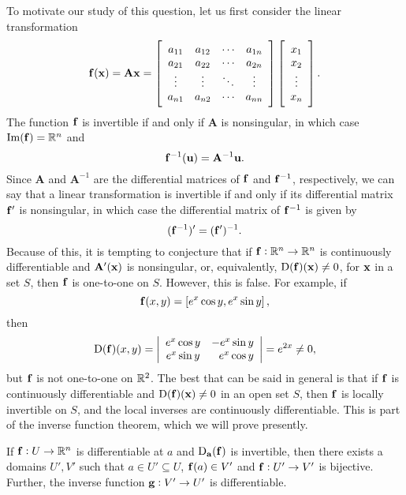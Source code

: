 To motivate our study of this question, let us first consider
 the linear transformation
$$
\mathbf{ f}(\mathbf{ x})=\mathbf{A}\mathbf{ x}=\left[\begin{array}{cccc}
a_{11}&a_{12}&\cdots&a_{1n}\\
a_{21}&a_{22}&\cdots&a_{2n}\\\vdots&\vdots&\ddots&\vdots\\
a_{n1}&a_{n2}&\cdots&a_{nn}\end{array}\right]
\left[\begin{array}{c} x_1\\ x_2\\\vdots\\ x_n\end{array}\right].
$$
The function $\mathbf{ f}$ is invertible if and only if
$\mathbf{A}$ is nonsingular, in which case $\operatorname{Im}(\mathbf{ f})=\mathbb{R}^n$ and
$$
\mathbf{ f}^{-1}(\mathbf{ u})=\mathbf{A}^{-1}\mathbf{ u}.
$$
Since $\mathbf{A}$ and $\mathbf{A}^{-1}$ are the differential matrices of
$\mathbf{ f}$ and $\mathbf{ f}^{-1}$, respectively, we can say that a linear
transformation is invertible if and only if its differential matrix
$\mathbf{ f}'$ is nonsingular, in which case the differential matrix of
$\mathbf{ f}^{-1}$ is given by
$$
(\mathbf{ f}^{-1})'=(\mathbf{ f}')^{-1}.
$$
Because of this, it is tempting to conjecture that if $\mathbf{ f}:
\mathbb{R}^n\to \mathbb{R}^n$ is continuously differentiable
 and $\mathbf{A}'(\mathbf{ x})$
 is nonsingular, or, equivalently, ${\mathrm{D}}(\mathbf{ f})(\mathbf{ x})\ne0$, for
$\mathbf{ x}$ in a set $S$, then $\mathbf{ f}$ is one-to-one on $S$. However,
this is false. For example, if
$$
\mathbf{ f}(x,y)=\left[ e^x\cos y, e^x\sin
y\right],
$$
then
\begin{equation} \label{eq:6.3.19}
{\mathrm{D}}(\mathbf{ f})(x,y)=\left|\begin{array}{cr} e^x\cos y&-e^x\sin y\\
e^x\sin y&e^x\cos y\end{array}\right|=e^{2x}\ne0,
\end{equation}
but $\mathbf{ f}$ is not one-to-one on $\mathbb{R}^2$. The best that can be said in general is
that if $\mathbf{ f}$ is continuously differentiable and
 ${\mathrm{D}}(\mathbf{ f})(\mathbf{ x})
\ne0$ in an open set $S$, then $\mathbf{ f}$ is locally invertible on
$S$, and the local inverses are continuously differentiable. This is
part of the inverse function theorem, which we will prove presently.
 
  \begin{theorem}
    If $\mathbf{ f}: U \to \mathbb{R} ^n$ is differentiable at $a$ and ${\mathrm{D}}_{{\mathbf a}}(\mathbf{ f})$ is invertible, then there exists a domains $U', V'$ such that $a \in U' \subseteq U$, $\mathbf{ f}(a) \in V'$ and $\mathbf{ f}: U' \to V'$ is bijective.
    Further, the inverse function $\mathbf{ g}:V' \to U'$ is differentiable.
  \end{theorem}

